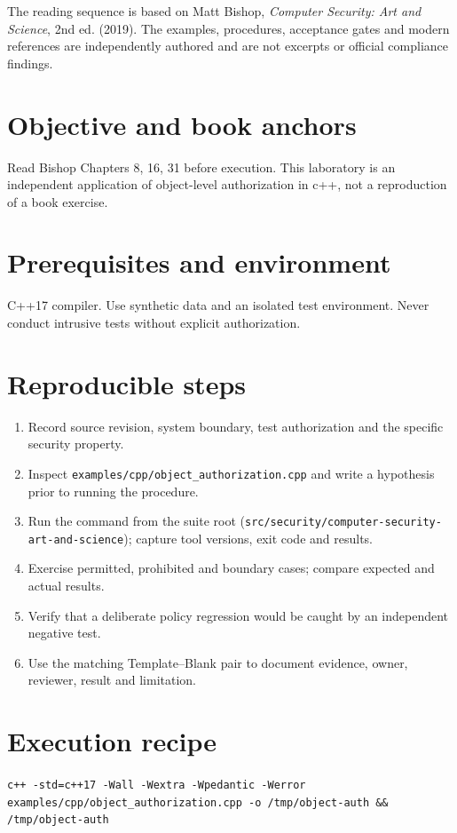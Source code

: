 \documentclass[10pt,letterpaper]{article}
\begin{document}
\makedoctocpage
\begin{notebox}
The reading sequence is based on Matt Bishop, \emph{Computer Security: Art and Science}, 2nd ed. (2019). The examples, procedures, acceptance gates and modern references are independently authored and are not excerpts or official compliance findings.
\end{notebox}
\section{Objective and book anchors}
Read Bishop Chapters 8, 16, 31 before execution. This laboratory is an independent application of object-level authorization in c++, not a reproduction of a book exercise.
\section{Prerequisites and environment}
C++17 compiler. Use synthetic data and an isolated test environment. Never conduct intrusive tests without explicit authorization.
\section{Reproducible steps}
\begin{enumerate}
\item Record source revision, system boundary, test authorization and the specific security property.
\item Inspect \texttt{examples/cpp/object\_authorization.cpp} and write a hypothesis prior to running the procedure.
\item Run the command from the suite root (\texttt{src/security/computer-security-art-and-science}); capture tool versions, exit code and results.
\item Exercise permitted, prohibited and boundary cases; compare expected and actual results.
\item Verify that a deliberate policy regression would be caught by an independent negative test.
\item Use the matching Template--Blank pair to document evidence, owner, reviewer, result and limitation.
\end{enumerate}
\section{Execution recipe}
\begin{viewbox}\raggedright\small\texttt{c++ -std=c++17 -Wall -Wextra -Wpedantic -Werror examples/cpp/object\_authorization.cpp -o /tmp/object-auth \&\& /tmp/object-auth}\end{viewbox}
\end{document}

